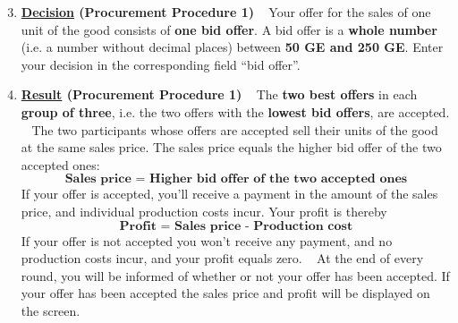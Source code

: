 \documentclass[11pt]{article}
\begin{document}
\begin{enumerate}[label=\textbf{\upshape(\arabic*\upshape)}] \setcounter{enumi}{2}
	\item \textbf{\underline{Decision} (Procurement Procedure 1)} ~\smallbreak
		Your offer for the sales of one unit of the good consists of \textbf{one bid offer}. A bid offer is a \textbf{whole number} (i.e. a number without decimal places) between \textbf{50 GE and 250 GE}. Enter your decision in the corresponding field \enquote{bid offer}.
	\item \textbf{\underline{Result} (Procurement Procedure 1)} ~\smallbreak
		The \textbf{two best offers} in each \textbf{group of three}, i.e. the two offers with the \textbf{lowest bid offers}, are accepted. ~\smallbreak
		The two participants whose offers are accepted sell their units of the good at the same sales price. The sales price equals the higher bid offer of the two accepted ones:
			$$ \textbf{Sales price = Higher bid offer of the two accepted ones}  $$
		If your offer is accepted, you’ll receive a payment in the amount of the sales price, and individual production costs incur. Your profit is thereby
			$$ \textbf{Profit = Sales price - Production cost} $$
		If your offer is not accepted you won’t receive any payment, and no production costs incur, and your profit equals zero. ~\smallbreak
		At the end of every round, you will be informed of whether or not your offer has been accepted. If your offer has been accepted the sales price and profit will be displayed on the screen.
\end{enumerate}
\end{document}
